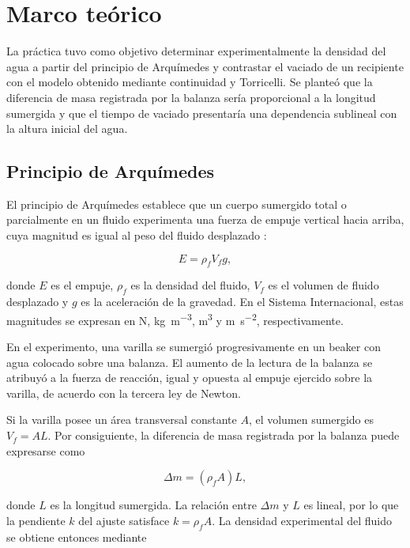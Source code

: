 \section{Marco teórico}

La práctica tuvo como objetivo determinar experimentalmente la densidad del agua a partir del principio de Arquímedes y contrastar el vaciado de un recipiente con el modelo obtenido mediante continuidad y Torricelli. Se planteó que la diferencia de masa registrada por la balanza sería proporcional a la longitud sumergida y que el tiempo de vaciado presentaría una dependencia sublineal con la altura inicial del agua.

\subsection{Principio de Arquímedes}

El principio de Arquímedes establece que un cuerpo sumergido total o parcialmente en un fluido experimenta una fuerza de empuje vertical hacia arriba, cuya magnitud es igual al peso del fluido desplazado \cite{serway2018,young2018}:

\begin{equation}
    E = \rho_f V_f g,
    \label{eq:empuje}
\end{equation}

donde $E$ es el empuje, $\rho_f$ es la densidad del fluido, $V_f$ es el volumen de fluido desplazado y $g$ es la aceleración de la gravedad. En el Sistema Internacional, estas magnitudes se expresan en \si{\newton}, \si{\kilogram\per\cubic\meter}, \si{\cubic\meter} y \si{\meter\per\second\squared}, respectivamente.

En el experimento, una varilla se sumergió progresivamente en un beaker con agua colocado sobre una balanza. El aumento de la lectura de la balanza se atribuyó a la fuerza de reacción, igual y opuesta al empuje ejercido sobre la varilla, de acuerdo con la tercera ley de Newton.

Si la varilla posee un área transversal constante $A$, el volumen sumergido es $V_f=AL$. Por consiguiente, la diferencia de masa registrada por la balanza puede expresarse como

\begin{equation}
    \Delta m = (\rho_f A)L,
    \label{eq:deltam}
\end{equation}

donde $L$ es la longitud sumergida. La relación entre $\Delta m$ y $L$ es lineal, por lo que la pendiente $k$ del ajuste satisface $k=\rho_f A$. La densidad experimental del fluido se obtiene entonces mediante

